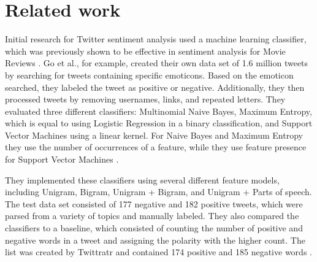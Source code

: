 \chapter{Related work}
\label{cha:Chapter2_RelatedWork}
\iffalse

Length: 1-2 pages

Effort: ~2 weeks

2-3 Arbeiten maximal, die genauer betrachtet werden
Ruhig mehr Zitate --> aber nicht detailliert betrachten
Introduction to Data Mining --> zu generell, nur als Zitat
Hier nur im engsten Sinne


Content
\begin{itemize}
\item Alec Go, Richa Bhayani, and Lei Huang. 2009. Twitter Sentiment Classification Using Distant Supervision.
Technical Report. Standford.
\item Taboada or Serendio or Vader?
\item Khuc et al.
\end{itemize}

\fi
Initial research for Twitter sentiment analysis used a machine learning classifier, which was previously shown to be effective in sentiment analysis for Movie Reviews \cite{GoBHaHua2009}. Go et al., for example, created their own data set of 1.6 million tweets by searching for tweets containing specific emoticons. Based on the emoticon searched, they labeled the tweet as positive or negative. Additionally, they then processed tweets by removing usernames, links, and repeated letters. They evaluated three different classifiers: Multinomial Naive Bayes, Maximum Entropy, which is equal to using Logistic Regression in a binary classification, and Support Vector Machines using a linear kernel. For Naive Bayes and Maximum Entropy they use the number of occurrences of a feature, while they use feature presence for Support Vector Machines \cite{GoBHaHua2009}. 

They implemented these classifiers using several different feature models, including Unigram, Bigram, Unigram + Bigram, and Unigram + Parts of speech. The test data set consisted of 177 negative and 182 positive tweets, which were parsed from a variety of topics and manually labeled. They also compared the classifiers to a baseline, which consisted of counting the number of positive and negative words in a tweet and assigning the polarity with the higher count. The list was created by Twittratr and contained 174 positive and 185 negative words \cite{GoBHaHua2009}. 

